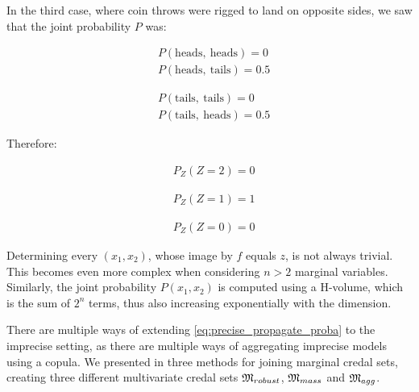 \begin{example}
    In the third case, where coin throws were rigged to land on opposite sides, we saw that the joint probability $P$ was:\\
    \noindent\begin{minipage}[b]{0.5\linewidth}
    \begin{align*}
        & P(\text{heads}, ~\text{heads}) = 0\\
        & P(\text{heads}, ~\text{tails}) = 0.5
    \end{align*}
    \end{minipage}
    \begin{minipage}[b]{0.5\linewidth}
    \begin{align*}
        & P(\text{tails}, ~\text{tails}) = 0\\
        & P(\text{tails}, ~\text{heads}) = 0.5
    \end{align*}
    \end{minipage}
    Therefore:\\
    \begin{minipage}[b]{0.33\linewidth}
    \begin{align*}
        & P_Z(Z=2) = 0
    \end{align*}
    \end{minipage}
    \begin{minipage}[b]{0.33\linewidth}
    \begin{align*}
        & P_Z(Z=1) = 1
    \end{align*}
    \end{minipage}
    \begin{minipage}[b]{0.33\linewidth}
    \begin{align*}
        & P_Z(Z=0) = 0
    \end{align*}
    \end{minipage}
\end{example}

Determining every $(x_1, x_2)$, whose image by $f$ equals $z$, is not always trivial. This becomes even more complex when considering $n>2$ marginal variables. Similarly, the joint probability $P(x_1,x_2)$ is computed using a H-volume, which is the sum of $2^n$ terms, thus also increasing exponentially with the dimension.

There are multiple ways of extending \cref{eq:precise_propagate_proba} to the imprecise setting, as there are multiple ways of aggregating imprecise models using a copula. We presented in  three methods for joining marginal credal sets, creating three different multivariate credal sets $\mathfrak{M}_{robust}$, $\mathfrak{M}_{mass}$ and $\mathfrak{M}_{agg}$.

